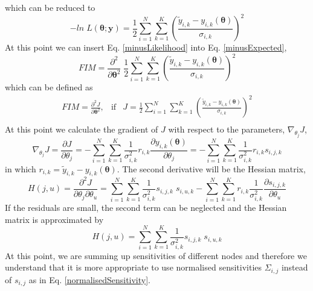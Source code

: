 \documentclass[a4paper, 11pt]{article}
\begin{document}
which can be reduced to
\begin{equation} \label{minusLikelihood}
  -ln\;L(\bm{\theta};\bm{y})=\frac{1}{2}\sum_{i=1}^{N}\sum_{k=1}^{K}\left(\frac{\tilde{y}_{i,k}-y_{i,k}(\bm{\theta})}{\sigma_{i,k}}\right)^2
\end{equation}
At this point we can insert Eq. \ref{minusLikelihood} into Eq. \ref{minusExpected}, 
\begin{equation}
  FIM=\frac{\partial^2}{\partial\bm{\theta}^2}\;\frac{1}{2}\displaystyle\sum_{i=1}^{N}\sum_{k=1}^{K}\left(\frac{\tilde{y}_{i,k}-y_{i,k}(\bm{\theta})}{\sigma_{i,k}}\right)^2
\end{equation}
which can be defined as
\begin{equation}
  \begin{array}{ccc}
    FIM=\frac{\partial^2J}{\partial\bm{\theta}^2}, & \mathrm{if} & J=\frac{1}{2}\displaystyle\sum_{i=1}^{N}\sum_{k=1}^{K}\left(\frac{\tilde{y}_{i,k}-y_{i,k}(\bm{\theta})}{\sigma_{i,k}}\right)^2 \\
  \end{array}
\end{equation}
At this point we calculate the gradient of $J$ with respect to the parameters, $\nabla_{\theta_{j}}J$, 
\begin{equation}
  \nabla_{\theta_{j}}J=\frac{\partial J}{\partial \theta_j} = 
  - \displaystyle\sum_{i=1}^{N}\sum_{k=1}^{K}\frac{1}{\sigma_{i,k}^{2}}r_{i,k}\frac{\partial y_{i,k}(\bm{\theta})}{\partial \theta_j} =
  - \displaystyle\sum_{i=1}^{N}\sum_{k=1}^{K}\frac{1}{\sigma_{i,k}^{2}}r_{i,k}s_{i,j,k}
\end{equation}
in which $r_{i,k}=\tilde{y}_{i,k}-y_{i,k}(\bm{\theta})$.
The second derivative will be the Hessian matrix, 
\begin{equation}
  H(j,u)=\frac{\partial^2J}{\partial\theta_j\partial\theta_u}=
  \sum_{i=1}^{N}\sum_{k=1}^{K}\frac{1}{\sigma_{i,k}^2}s_{i,j,k}\;s_{i,u,k}-
  \sum_{i=1}^{N}\sum_{k=1}^{K}r_{i,k}\frac{1}{\sigma_{i,k}^2}\frac{\partial s_{i,j,k}}{\partial \theta_u}
\end{equation}
If the residuals are small, the second term can be neglected and the Hessian matrix is approximated by
\begin{equation}
  H(j,u)=\sum_{i=1}^{N}\sum_{k=1}^{K}\frac{1}{\sigma_{i,k}^2}s_{i,j,k}\;s_{i,u,k}
\end{equation}
At this point, we are summing up sensitivities of different nodes and therefore we understand that it is more appropriate to use normalised sensitivities $\Sigma_{i,j}$ instead of $s_{i,j}$ as in Eq. \ref{normalisedSensitivity}.
\end{document}
